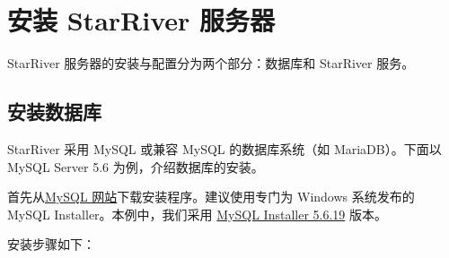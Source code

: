 \section{安装 StarRiver
服务器}\label{ux5b89ux88c5-starriver-ux670dux52a1ux5668}

StarRiver 服务器的安装与配置分为两个部分：数据库和 StarRiver 服务。

\subsection{安装数据库}\label{ux5b89ux88c5ux6570ux636eux5e93}

StarRiver 采用 MySQL 或兼容 MySQL 的数据库系统（如 MariaDB）。下面以
MySQL Server 5.6 为例，介绍数据库的安装。

首先从\href{http://dev.mysql.com/downloads/mysql/}{MySQL
网站}下载安装程序。建议使用专门为 Windows 系统发布的 MySQL
Installer。本例中，我们采用
\href{http://dev.mysql.com/downloads/windows/installer/5.6.html}{MySQL
Installer 5.6.19} 版本。

安装步骤如下：

